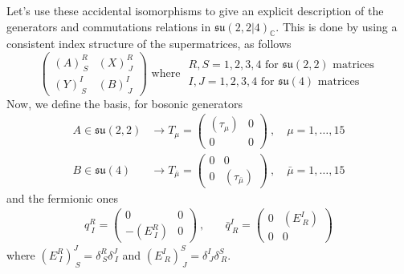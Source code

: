 \documentclass[a4paper,12pt]{article}
\numberwithin{equation}{section}
\numberwithin{thm}{section}
\numberwithin{exm}{section}
\newcommand{\C}{{\mathbb C}}
\newcommand{\<}{{\langle}}
\renewcommand{\>}{{\rangle}}
\newcommand{\mf}{\mathfrak}
\renewcommand{\d}{{\delta}}
\newcommand{\m}{{\mu}}
\begin{document}
Let's use these accidental isomorphisms to give an explicit description of the generators and commutations relations in $\mf{su}(2,2|4)_\C$. This is done by using a consistent index structure of the supermatrices, as follows
	\begin{equation}
	\left(
		\begin{array}{cc}
		(A)^R_{\ S} & (X)^R_{\ J} \\
		(Y)^I_{\ S} & (B)^I_{\ J}
		\end{array}
	\right)\text{ where }
		\begin{array}{c}
		R,S=1,2,3,4\text{ for } \mf{su}(2,2)\text{ matrices} \\
		I,J=1,2,3,4\text{ for } \mf{su}(4)\text{ matrices}
		\end{array}
	\end{equation}
Now, we define the basis, for bosonic generators
	\begin{align}
	A\in\mf{su}(2,2)&\longrightarrow T_{\m} = \left(
		\begin{array}{cc}
		(\tau_\m) & 0 \\
		0 & 0
		\end{array}
	\right)\ ,\quad\m=1,\ldots,15 \\
	B\in\mf{su}(4)&\longrightarrow T_{\bar\m} = \left(
		\begin{array}{cc}
		0 & 0 \\
		0 & (\tau_{\bar\m})
		\end{array}
	\right)\ ,\quad\bar\m = 1,\ldots,15
	\end{align}
and the fermionic ones
	\begin{align}
	q^R_{\ I} = \left(
		\begin{array}{cc}
		0 & 0 \\
		-(E^R_{\ I}) & 0
		\end{array}
	\right)\ ,& \quad \bar q^I_{\ R} = \left(
		\begin{array}{cc}
		0 & (E^I_{\ R}) \\
		0 & 0
		\end{array}
	\right)
	\end{align}
where $(E^R_{\ I})^J_{\ S} = \d^R_{\ S} \d^J_{\ I}$ and $(E^I_{\ R})^S_{\ J} = \d^I_{\ J} \d^S_{\ R}$.
\end{document}

